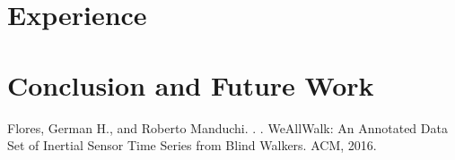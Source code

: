 \documentclass[11pt]{article}
\begin{document}
\section{Experience}





\section{Conclusion and Future Work}






%
%

\begin{thebibliography}{}

Flores, German H., and Roberto Manduchi.
.
.
\newblock WeAllWalk: An Annotated Data Set of Inertial Sensor Time Series from Blind Walkers. ACM, 2016.






\end{thebibliography}
\end{document}
